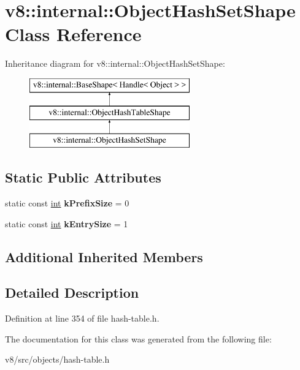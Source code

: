 \hypertarget{classv8_1_1internal_1_1ObjectHashSetShape}{}\section{v8\+:\+:internal\+:\+:Object\+Hash\+Set\+Shape Class Reference}
\label{classv8_1_1internal_1_1ObjectHashSetShape}
Inheritance diagram for v8\+:\+:internal\+:\+:Object\+Hash\+Set\+Shape\+:\begin{figure}[H]
\begin{center}
\leavevmode
\includegraphics[height=3.000000cm]{classv8_1_1internal_1_1ObjectHashSetShape}
\end{center}
\end{figure}
\subsection*{Static Public Attributes}
\begin{DoxyCompactItemize}
\item 
\mbox{\label{classv8_1_1internal_1_1ObjectHashSetShape_af91271b76b962481c9934b027d94e5bd}} 
static const \mbox{\hyperlink{classint}{int}} {\bfseries k\+Prefix\+Size} = 0
\item 
\mbox{\label{classv8_1_1internal_1_1ObjectHashSetShape_a314571d54486cf3148ad9e07e803be62}} 
static const \mbox{\hyperlink{classint}{int}} {\bfseries k\+Entry\+Size} = 1
\end{DoxyCompactItemize}
\subsection*{Additional Inherited Members}


\subsection{Detailed Description}


Definition at line 354 of file hash-\/table.\+h.



The documentation for this class was generated from the following file\+:\begin{DoxyCompactItemize}
\item 
v8/src/objects/hash-\/table.\+h\end{DoxyCompactItemize}
